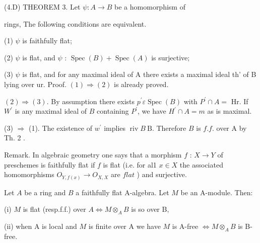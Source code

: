 (4.D) THEOREM 3. Let $\psi: A \rightarrow B$ be a homomorphism of

rings, The following conditions are equivalent.

(1) $\psi$ is faithfully flat;

(2) $\psi$ is flat, and $\psi$ : $\operatorname{Spec}(B)+\operatorname{Spec}(A)$ is surjective;

(3) $\psi$ is flat, and for any maximal ideal of A there exists a maximal ideal th' of B lying over ur. Proof. $(1) \Rightarrow(2)$ is already proved.

$(2) \Rightarrow(3)$. By assumption there exists $p^{\prime} \varepsilon \operatorname{Spec}(B)$ with $P^{\prime} \cap A=$ Hr. If $W^{\prime}$ is any maximal ideal of $B$ containing $P^{\prime}$, we have $H^{\prime} \cap A=m$ as is maximal.

(3) $\Rightarrow$ (1). The existence of $w^{\prime}$ implies $\operatorname{riv} B \mathrm{~B}$. Therefore $B$ is $f . f$. over A by Th. 2 .

Remark. In algebraic geometry one says that a morphism $f$ : $X \rightarrow Y$ of preschemes is faithfully flat if $f$ is flat (i.e. for al1 $x \in X$ the associated homomorphisms $O_{Y, f(x)} \rightarrow O_{X, X}$ are $f l a t$ ) and surjective.

Let $A$ be a ring and $B$ a faithfully flat A-algebra. Let $M$ be an A-module. Then:

(i) $M$ is flat (resp.f.f.) over $A \Leftrightarrow M \otimes_{A} B$ is so over B,

(ii) when A is local and $M$ is finite over A we have $M$ is A-free $\Leftrightarrow M \otimes_{A} B$ is B-free.

